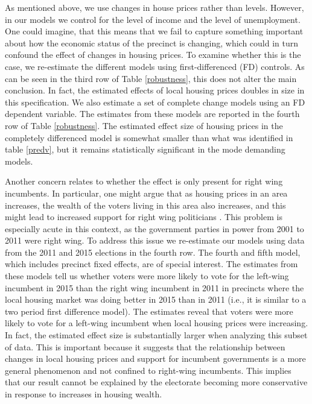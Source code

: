 \documentclass[12pt,a4paper]{article}
\begin{document}
	As mentioned above, we use changes in house prices rather than levels. However, in our models we control for the level of income and the level of unemployment. One could imagine, that this means that we fail to capture something important about how the economic status of the precinct is changing, which could in turn confound the effect of changes in housing prices. To examine whether this is the case, we re-estimate the different models using first-differenced (FD) controls. As can be seen in the third row of Table \ref{robustness}, this does not alter the main conclusion. In fact, the estimated effects of local housing prices doubles in size in this specification. We also estimate a set of complete change models using an FD dependent variable. The estimates from these models are reported in the fourth row of Table \ref{robustness}. The estimated effect size of housing prices in the completely differenced model is somewhat smaller than what was identified in table \ref{predv}, but it remains statistically significant in the mode demanding models.
	
	Another concern relates to whether the effect is only present for right wing incumbents. In particular, one might argue that as housing prices in an area increases, the wealth of the voters living in this area also increases, and this might lead to increased support for right wing politicians \cite{ansell2014political}. This problem is especially acute in this context, as the government parties in power from 2001 to 2011 were right wing. To address this issue we re-estimate our models using data from the 2011 and 2015 elections in the fourth row. The fourth and fifth model, which includes precinct fixed effects, are of special interest. The estimates from these models tell us whether voters were more likely to vote for the left-wing incumbent in 2015 than the right wing incumbent in 2011 in precincts where the local housing market was doing better in 2015 than in 2011 (i.e., it is similar to a two period first difference model). The estimates reveal that voters were more likely to vote for a left-wing incumbent when local housing prices were increasing. In fact, the estimated effect size is substantially larger when analyzing this subset of data. This is important because it suggests that the relationship between changes in local housing prices and support for incumbent governments is a more general phenomenon and not confined to right-wing incumbents. This implies that our result cannot be explained by the electorate becoming more conservative in response to increases in housing wealth.
	
\end{document}
